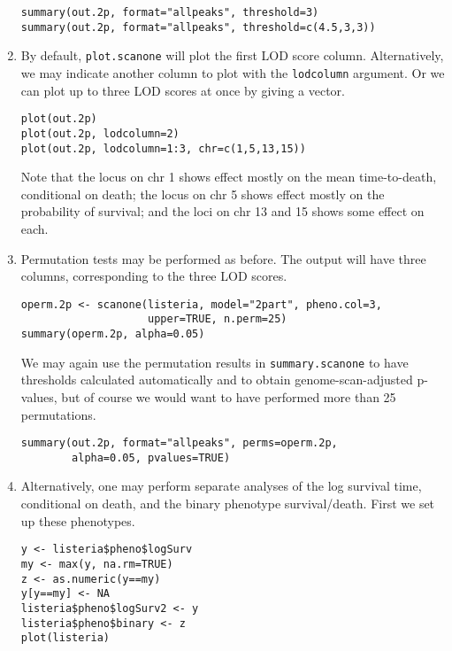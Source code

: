 \documentclass[10pt,letterpaper]{article}
\newcommand{\usercolor}{\color [named]{BlueViolet}}
\begin{document}
\begin{enumerate}
\usercolor
\verb|summary(out.2p, format="allpeaks", threshold=3)| \\
\verb|summary(out.2p, format="allpeaks", threshold=c(4.5,3,3))| 
\normalcolor

\item By default, \verb-plot.scanone- will plot the first LOD score
  column.  Alternatively, we may indicate another column to plot with
  the \verb-lodcolumn- argument.  Or we can plot up to three LOD
  scores at once by giving a vector.

\usercolor
\verb|plot(out.2p)| \\
\verb|plot(out.2p, lodcolumn=2)| \\
\verb|plot(out.2p, lodcolumn=1:3, chr=c(1,5,13,15))|
\normalcolor

Note that the locus on chr 1 shows effect mostly on the
mean time-to-death, conditional on death; the locus on chr 5
shows effect mostly on the probability of survival; and the loci on
chr 13 and 15 shows some effect on each. 

\item Permutation tests may be performed as before.  The output will
have three columns, corresponding to the three LOD scores.

\usercolor 
\verb|operm.2p <- scanone(listeria, model="2part", pheno.col=3,| \\
\verb|                    upper=TRUE, n.perm=25)| \\
\verb|summary(operm.2p, alpha=0.05)|
\normalcolor 

We may again use the permutation results in \verb-summary.scanone- to
have thresholds calculated automatically and to obtain
genome-scan-adjusted p-values, but of course we would want to have
performed more than 25 permutations.

\usercolor
\verb|summary(out.2p, format="allpeaks", perms=operm.2p,| \\
\verb|        alpha=0.05, pvalues=TRUE)|
\normalcolor

\item Alternatively, one may perform separate analyses of the log
survival time, conditional on death, and the binary phenotype
survival/death.  First we set up these phenotypes.

\usercolor
\verb|y <- listeria$pheno$logSurv| \\ 
\verb|my <- max(y, na.rm=TRUE)| \\
\verb|z <- as.numeric(y==my)| \\
\verb|y[y==my] <- NA| \\
\verb|listeria$pheno$logSurv2 <- y| \\
\verb|listeria$pheno$binary <- z| \\
\verb|plot(listeria)|
\normalcolor


\end{enumerate}
\end{document}
